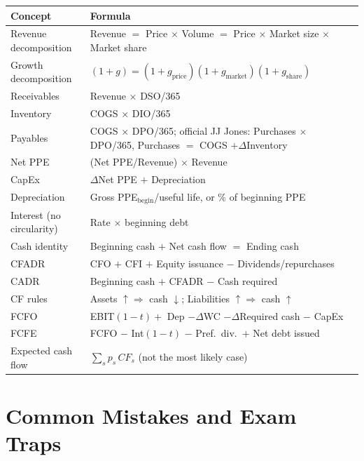 \begin{center}
\small
\renewcommand{\arraystretch}{1.4}
\begin{tabular}{@{}p{5cm}p{10cm}@{}}
\toprule
\textbf{Concept} & \textbf{Formula}\\
\midrule
Revenue decomposition & Revenue $=$ Price $\times$ Volume $=$ Price $\times$ Market size $\times$ Market share\\
Growth decomposition & $(1+g)=(1+g_{\text{price}})(1+g_{\text{market}})(1+g_{\text{share}})$\\
Receivables & Revenue $\times$ DSO/365\\
Inventory & COGS $\times$ DIO/365\\
Payables & COGS $\times$ DPO/365; official JJ Jones: Purchases $\times$ DPO/365, Purchases $=$ COGS $+\Delta$Inventory\\
Net PPE & (Net PPE/Revenue) $\times$ Revenue\\
CapEx & $\Delta$Net PPE $+$ Depreciation\\
Depreciation & Gross PPE$_{\text{begin}}$/useful life, or \% of beginning PPE\\
Interest (no circularity) & Rate $\times$ beginning debt\\
Cash identity & Beginning cash $+$ Net cash flow $=$ Ending cash\\
CFADR & CFO $+$ CFI $+$ Equity issuance $-$ Dividends/repurchases\\
CADR & Beginning cash $+$ CFADR $-$ Cash required\\
CF rules & Assets $\uparrow\Rightarrow$ cash $\downarrow$; Liabilities $\uparrow\Rightarrow$ cash $\uparrow$\\
FCFO & EBIT$(1-t)+$ Dep $-\Delta$WC $-\Delta$Required cash $-$ CapEx\\
FCFE & FCFO $-$ Int$(1-t)$ $-$ Pref.\ div.\ $+$ Net debt issued\\
Expected cash flow & $\sum_s p_s\,CF_s$ (not the most likely case)\\
\bottomrule
\end{tabular}
\end{center}

\section{Common Mistakes and Exam Traps}

